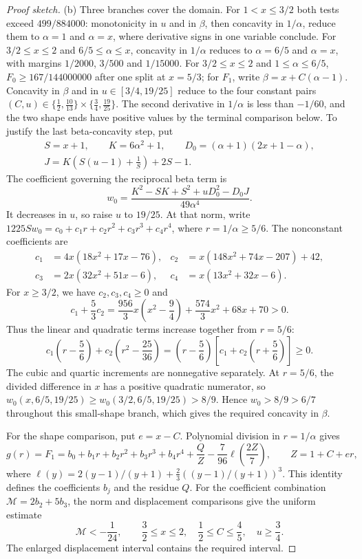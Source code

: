\begin{proof}[Proof sketch]
(b) Three branches cover the domain. For $1<x\le3/2$ both tests exceed $499/884000$: monotonicity
in $u$ and in $\beta$, then concavity in $1/\alpha$, reduce them to $\alpha=1$ and $\alpha=x$, where
derivative signs in one variable conclude. For $3/2\le x\le2$ and $6/5\le\alpha\le x$, concavity in
$1/\alpha$ reduces to $\alpha=6/5$ and $\alpha=x$, with margins $1/2000$, $3/500$ and $1/15000$.
For $3/2\le x\le2$ and $1\le\alpha\le6/5$, $F_0\ge167/144000000$ after one split at $x=5/3$; for
$F_1$, write $\beta=x+C(\alpha-1)$. Concavity in $\beta$ and in $u\in[3/4,19/25]$
reduce to the four constant pairs
$(C,u)\in\{\frac12,\frac{10}{13}\}\times\{\frac34,\frac{19}{25}\}$.
The second derivative in $1/\alpha$ is less than $-1/60$, and the two shape ends have
positive values by the terminal comparison below.
To justify the last beta-concavity step, put
\begin{gather*}
 S=x+1,\qquad K=6\alpha^2+1,\qquad D_0=(\alpha+1)(2x+1-\alpha),\\
 J=K\left(S(u-1)+\frac1S\right)+2S-1.
\end{gather*}
The coefficient governing the reciprocal beta term is
\[
 w_0=\frac{K^2-SK+S^2+uD_0^2-D_0J}{49\alpha^4}.
\]
It decreases in $u$, so raise $u$ to $19/25$. At that norm, write
$1225S w_0=c_0+c_1r+c_2r^2+c_3r^3+c_4r^4$, where $r=1/\alpha\ge5/6$.
The nonconstant coefficients are
\begin{align*}
 c_1&=4x(18x^2+17x-76),&
 c_2&=x(148x^2+74x-207)+42,\\
 c_3&=2x(32x^2+51x-6),&
 c_4&=x(13x^2+32x-6).
\end{align*}
For $x\ge3/2$, we have $c_2,c_3,c_4\ge0$ and
\[
 c_1+\frac53c_2
 =\frac{956}3x\left(x^2-\frac94\right)
   +\frac{574}3x^2+68x+70>0.
\]
Thus the linear and quadratic terms increase together from $r=5/6$:
\[
 c_1\left(r-\frac56\right)+c_2\left(r^2-\frac{25}{36}\right)
 =\left(r-\frac56\right)\left[c_1+c_2\left(r+\frac56\right)\right]\ge0.
\]
The cubic and quartic increments are nonnegative separately. At $r=5/6$,
the divided difference in $x$ has a positive quadratic numerator, so
$w_0(x,6/5,19/25)\ge w_0(3/2,6/5,19/25)>8/9$.
Hence $w_0>8/9>6/7$ throughout this small-shape branch, which gives the
required concavity in $\beta$.

For the shape comparison, put $e=x-C$.
Polynomial division in $r=1/\alpha$ gives
\[
 g(r)=F_1=b_0+b_1r+b_2r^2+b_3r^3+b_4r^4
      +\frac QZ-\frac7{96}\ell\left(\frac{2Z}7\right),
 \qquad Z=1+C+er,
\]
where $\ell(y)=2(y-1)/(y+1)+\frac23((y-1)/(y+1))^3$.
This identity defines the coefficients $b_j$ and the residue $Q$.
For the coefficient combination $\mathcal M=2b_2+5b_3$, the norm and
displacement comparisons give the uniform estimate
\[
 \mathcal M<-\frac1{24},\qquad
 \frac32\le x\le2,\quad \frac12\le C\le\frac45,\quad u\ge\frac34.
\]
The enlarged displacement interval contains the required interval.


\end{proof}
